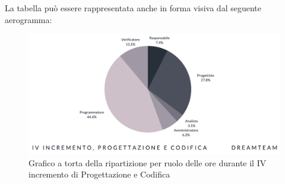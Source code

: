 La tabella può essere rappresentata anche in forma visiva dal seguente aerogramma:
\begin{figure}[H]
\centering
\includegraphics[scale=0.55]{Sezioni/SezioniPreventivo/grafici/Preventivo_torta_progettazione_IV.png}
\caption{Grafico a torta della ripartizione per ruolo delle ore durante il IV incremento di Progettazione e Codifica}
\end{figure}

\pagebreak

